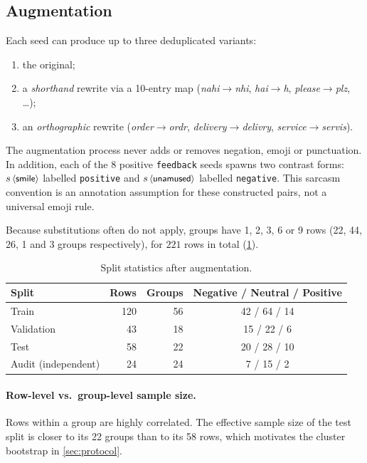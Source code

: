 \documentclass[11pt,a4paper]{article}
\theoremstyle{remark}
\newcommand{\lbl}[1]{\texttt{#1}}                      %
\newcommand{\hi}[1]{\textit{#1}}                       %
\newcommand{\emo}[1]{\textsf{\small$\langle$#1$\rangle$}} %
\begin{document}
\subsection{Augmentation}
Each seed can produce up to three deduplicated variants:
\begin{enumerate}
  \item the original;
  \item a \emph{shorthand} rewrite via a 10-entry map
        (\hi{nahi}$\to$\hi{nhi}, \hi{hai}$\to$\hi{h}, \hi{please}$\to$\hi{plz}, \dots);
  \item an \emph{orthographic} rewrite (\hi{order}$\to$\hi{ordr},
        \hi{delivery}$\to$\hi{delivry}, \hi{service}$\to$\hi{servis}).
\end{enumerate}
The augmentation process never adds or removes negation, emoji or punctuation. In
addition, each of the 8 positive \lbl{feedback} seeds spawns two contrast
forms: $s\,\emo{smile}$ labelled \lbl{positive} and $s\,\emo{unamused}$
labelled \lbl{negative}. This sarcasm convention is an annotation assumption
for these constructed pairs, not a universal emoji rule.

Because substitutions often do not apply, groups have 1, 2, 3, 6 or 9 rows
(22, 44, 26, 1 and 3 groups respectively), for $221$ rows in total
(\cref{tab:splits}).

\begin{table}[h]
\centering\small
\caption{Split statistics after augmentation.}
\label{tab:splits}
\begin{tabular}{@{}lrrc@{}}
\toprule
Split & Rows & Groups & Negative / Neutral / Positive \\
\midrule
Train      & 120 & 56 & 42 / 64 / 14 \\
Validation &  43 & 18 & 15 / 22 / \phantom{0}6 \\
Test       &  58 & 22 & 20 / 28 / 10 \\
\midrule
Audit (independent) & 24 & 24 & \phantom{0}7 / 15 / \phantom{0}2 \\
\bottomrule
\end{tabular}
\end{table}

\paragraph{Row-level vs.\ group-level sample size.} Rows within a group are
highly correlated. The effective sample size of the test split is closer to
its 22 groups than to its 58 rows, which motivates the cluster bootstrap in
\cref{sec:protocol}.
\end{document}
